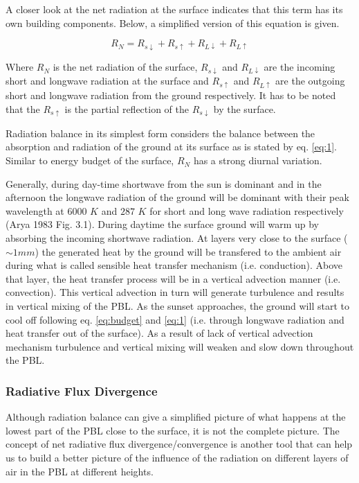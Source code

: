 \documentclass[a4paper,12pt]{article}
\numberwithin{equation}{section} %
\begin{document}
A closer look at the net radiation at the surface indicates that this term has its own building components. Below, a simplified version of this equation is given.

\vspace{0.25cm}
\begin{equation}\label{eq:1}
R_N = R_{s\downarrow} + R_{s\uparrow} + R_{L\downarrow} + R_{L\uparrow}
\end{equation}
\vspace{0.25cm}

Where $R_N$ is the net radiation of the surface, $R_{s\downarrow}$ and $R_{L\downarrow}$ are the incoming short and longwave radiation at the surface and $R_{s\uparrow}$ and $R_{L\uparrow}$ are the outgoing short and longwave radiation from the ground respectively. It has to be noted that the $R_{s\uparrow}$ is the partial reflection of the $R_{s\downarrow}$ by the surface.

Radiation balance in its simplest form considers the balance between the absorption and radiation of the ground at its surface as is stated by eq. \ref{eq:1}. Similar to energy budget of the surface, $R_N$ has a strong diurnal variation. 

Generally, during day-time shortwave from the sun is dominant and in the afternoon the longwave radiation of the ground will be dominant with their peak wavelength at $6000$ $K$ and $287$ $K$ for short and long wave radiation respectively (Arya 1983 Fig. 3.1). During daytime the surface ground will warm up by absorbing the incoming shortwave radiation. At layers very close to the surface ($\sim 1 mm$) the generated heat by the ground will be transfered to the ambient air during what is called sensible heat transfer mechanism (i.e. conduction). Above that layer, the heat transfer process will be in a vertical advection manner (i.e. convection). This vertical advection in turn will generate turbulence and results in vertical mixing of the PBL. As the sunset approaches, the ground will start to cool off following eq. \ref{eq:budget} and \ref{eq:1} (i.e. through longwave radiation and heat transfer out of the surface). As a result of lack of vertical advection mechanism turbulence and vertical mixing will weaken and slow down throughout the PBL.

\subsubsection{Radiative Flux Divergence}

Although radiation balance can give a simplified picture of what happens at the lowest part of the PBL close to the surface, it is not the complete picture. The concept of net radiative flux divergence/convergence is another tool that can help us to build a better picture of the influence of the radiation on different layers of air in the PBL at different heights.
\end{document}

